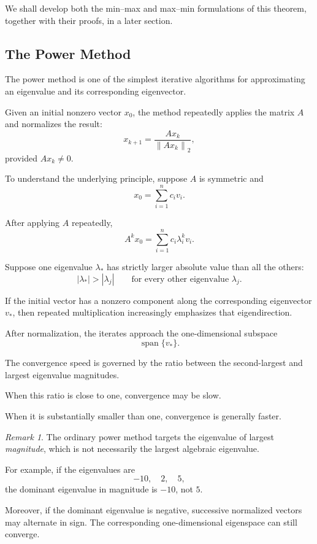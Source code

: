 \documentclass[14pt,letterpaper]{article}
\theoremstyle{plain}
\theoremstyle{definition}
\theoremstyle{remark}
\newtheorem{remark}[theorem]{Remark}
\newcommand{\norm}[1]{\left\lVert #1 \right\rVert}
\DeclareMathOperator{\Span}{span}
\begin{document}
We shall develop both the min--max
and max--min formulations of this
theorem, together with their proofs,
in a later section.

\subsection{The Power Method}
\label{subsec:power_background}

The power method is one of the simplest iterative
algorithms for approximating an eigenvalue
and its corresponding eigenvector.

Given an initial nonzero vector $x_0$, the method
repeatedly applies the matrix $A$ and normalizes
the result:
\[
\boxed{
x_{k+1}
=
\frac{Ax_k}{\norm{Ax_k}_2},
}
\]
provided $Ax_k\neq0$.

To understand the underlying principle, suppose
$A$ is symmetric and
\[
x_0=\sum_{i=1}^{n}c_i v_i.
\]

After applying $A$ repeatedly,
\[
A^k x_0
=
\sum_{i=1}^{n}c_i\lambda_i^k v_i.
\]

Suppose one eigenvalue $\lambda_*$ has
strictly larger absolute value than all
the others:
\[
|\lambda_*|>|\lambda_j|
\qquad
\text{for every other eigenvalue }\lambda_j.
\]

If the initial vector has a nonzero component
along the corresponding eigenvector $v_*$,
then repeated multiplication increasingly
emphasizes that eigendirection.

After normalization, the iterates approach
the one-dimensional subspace
\[
\Span\{v_*\}.
\]

The convergence speed is governed by the
ratio between the second-largest and largest
eigenvalue magnitudes.

When this ratio is close to one, convergence
may be slow.

When it is substantially smaller than one,
convergence is generally faster.

\begin{remark}
The ordinary power method targets the eigenvalue
of largest \emph{magnitude}, which is not
necessarily the largest algebraic eigenvalue.

For example, if the eigenvalues are
\[
-10,\quad 2,\quad 5,
\]
the dominant eigenvalue in magnitude is $-10$,
not $5$.

Moreover, if the dominant eigenvalue is negative,
successive normalized vectors may alternate in sign.
The corresponding one-dimensional eigenspace can
still converge.
\end{remark}
\end{document}
